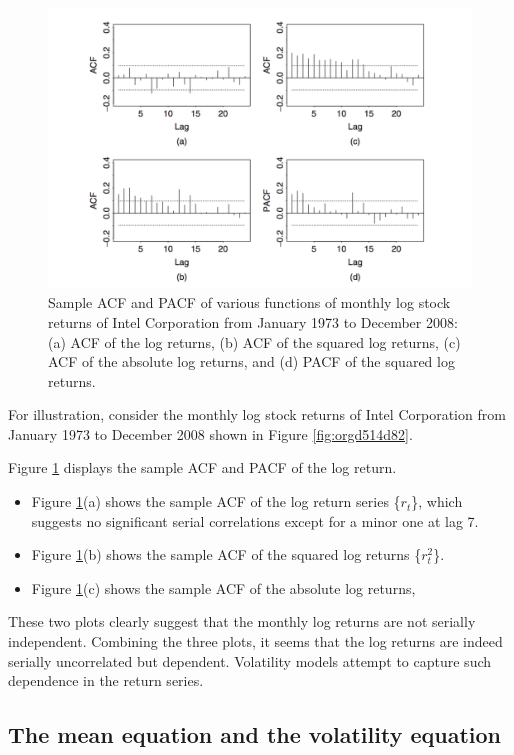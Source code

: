 \documentclass[a4paper,11pt]{article}
\begin{document}
\begin{figure}[htbp]
\centering
\includegraphics[width=\textwidth]{img/acf_intel.png}
\caption{\label{fig:orga23ad1d}
Sample ACF and PACF of various functions of monthly log stock returns of Intel Corporation from January 1973 to December 2008: (a) ACF of the log returns, (b) ACF of the squared log returns, (c) ACF of the absolute log returns, and (d) PACF of the squared log returns.}
\end{figure}

For illustration, consider the monthly log stock returns of Intel
Corporation from January 1973 to December 2008 shown in Figure
\ref{fig:orgd514d82}. 

Figure \ref{fig:orga23ad1d} displays the sample ACF and PACF of the
log return. 
\begin{itemize}
\item Figure \ref{fig:orga23ad1d}(a) shows the sample ACF of the log
return series \{\(r_t\)\}, which suggests no significant serial correlations
except for a minor one at lag 7.
\item Figure \ref{fig:orga23ad1d}(b) shows the sample ACF of the squared log returns
\{\(r^2_t\)\}.
\item Figure  \ref{fig:orga23ad1d}(c) shows the sample ACF of the absolute log returns,
\end{itemize}

These two plots clearly suggest that the monthly log returns are not
serially independent. Combining the three plots, it seems that the
log returns are indeed serially uncorrelated but
dependent. Volatility models attempt to capture such dependence in
the return series.

\subsection{The mean equation and the volatility equation}
\label{sec:org0538c97}
\end{document}
